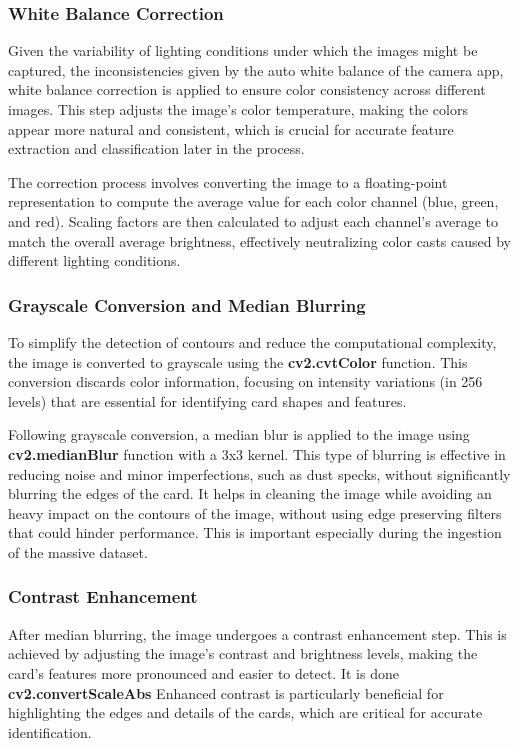 \documentclass[twocolumn, a4paper,10pt]{article}
\begin{document}
\subsubsection*{White Balance Correction}
Given the variability of lighting conditions under which the images might be captured, the inconsistencies given by the auto white balance of the camera app, white balance correction is applied to ensure color consistency across different images. This step adjusts the image's color temperature, making the colors appear more natural and consistent, which is crucial for accurate feature extraction and classification later in the process.

The correction process involves converting the image to a floating-point representation to compute the average value for each color channel (blue, green, and red). Scaling factors are then calculated to adjust each channel's average to match the overall average brightness, effectively neutralizing color casts caused by different lighting conditions.

\subsubsection*{Grayscale Conversion and Median Blurring}

To simplify the detection of contours and reduce the computational complexity, the image is converted to grayscale using the \textbf{cv2.cvtColor} function. This conversion discards color information, focusing on intensity variations (in 256 levels) that are essential for identifying card shapes and features.

Following grayscale conversion, a median blur is applied to the image using \textbf{cv2.medianBlur} function with a 3x3 kernel. This type of blurring is effective in reducing noise and minor imperfections, such as dust specks, without significantly blurring the edges of the card. It helps in cleaning the image while avoiding an heavy impact on the contours of the image, without using edge preserving filters that could hinder performance. This is important especially during the ingestion of the massive dataset.

\subsubsection*{Contrast Enhancement}
After median blurring, the image undergoes a contrast enhancement step. This is achieved by adjusting the image's contrast and brightness levels, making the card's features more pronounced and easier to detect. It is done \textbf{cv2.convertScaleAbs} Enhanced contrast is particularly beneficial for highlighting the edges and details of the cards, which are critical for accurate identification.
\end{document}
